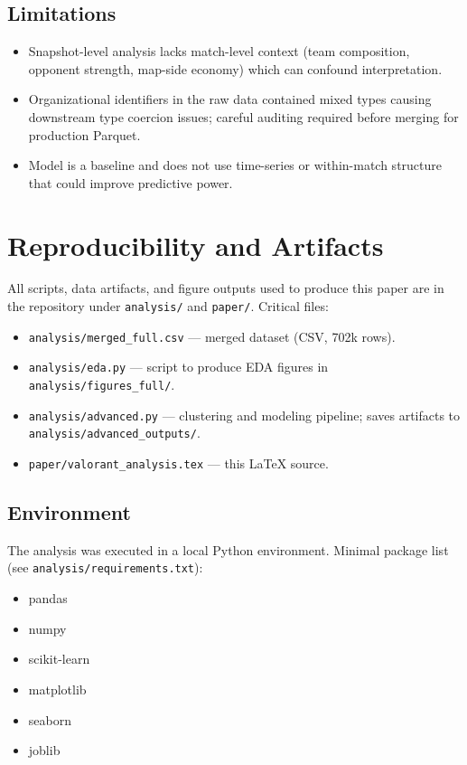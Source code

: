 \documentclass[11pt]{article}
\begin{document}
\subsection{Limitations}
\begin{itemize}
  \item Snapshot-level analysis lacks match-level context (team composition, opponent strength, map-side economy) which can confound interpretation.
  \item Organizational identifiers in the raw data contained mixed types causing downstream type coercion issues; careful auditing required before merging for production Parquet.
  \item Model is a baseline and does not use time-series or within-match structure that could improve predictive power.
\end{itemize}

\section{Reproducibility and Artifacts}
All scripts, data artifacts, and figure outputs used to produce this paper are in the repository under \texttt{analysis/} and \texttt{paper/}. Critical files:
\begin{itemize}
  \item \texttt{analysis/merged\_full.csv} — merged dataset (CSV, 702k rows).
  \item \texttt{analysis/eda.py} — script to produce EDA figures in \texttt{analysis/figures\_full/}.
  \item \texttt{analysis/advanced.py} — clustering and modeling pipeline; saves artifacts to \texttt{analysis/advanced\_outputs/}.
  \item \texttt{paper/valorant\_analysis.tex} — this LaTeX source.
\end{itemize}

\subsection{Environment}
The analysis was executed in a local Python environment. Minimal package list (see \texttt{analysis/requirements.txt}):
\begin{itemize}
  \item pandas
  \item numpy
  \item scikit-learn
  \item matplotlib
  \item seaborn
  \item joblib
\end{itemize}
\end{document}
